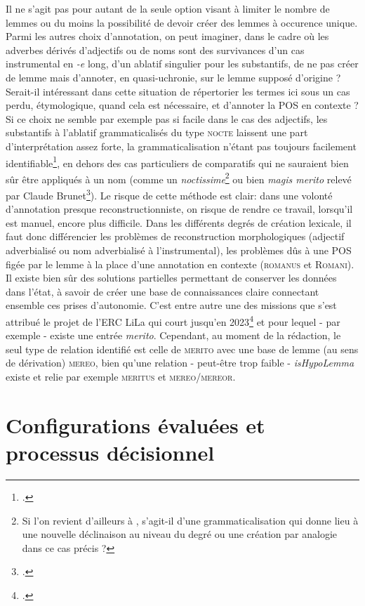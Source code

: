 Il ne s'agit pas pour autant de la seule option visant à limiter le nombre de lemmes ou du moins la possibilité de devoir créer des lemmes à occurence unique. Parmi les autres choix d'annotation, on peut imaginer, dans le cadre où les adverbes dérivés d'adjectifs ou de noms sont des survivances d'un cas instrumental en \textit{-e} long, d'un ablatif singulier pour les substantifs, de ne pas créer de lemme mais d'annoter, en quasi-uchronie, sur le lemme supposé d'origine ? Serait-il intéressant dans cette situation de répertorier les termes ici sous un cas perdu, étymologique, quand cela est nécessaire, et d'annoter la POS en contexte ? Si ce choix ne semble par exemple pas si facile dans le cas des adjectifs, les substantifs à l'ablatif grammaticalisés du type \textsc{nocte} laissent une part d'interprétation assez forte, la grammaticalisation n'étant pas toujours facilement identifiable\footcite{fruyt_adverbes_2008}, en dehors des cas particuliers de comparatifs qui ne sauraient bien sûr être appliqués à un nom (comme un \textit{noctissime}\footnote{Si l'on revient d'ailleurs à \cite{meillet_levolution_1922}, s'agit-il d'une grammaticalisation qui donne lieu à une nouvelle déclinaison au niveau du degré ou une création par analogie dans ce cas précis ?} ou bien \textit{magis merito} relevé par Claude Brunet\footcite{brunet_merito_2008}). Le risque de cette méthode est clair: dans une volonté d'annotation presque reconstructionniste, on risque de rendre ce travail, lorsqu'il est manuel, encore plus difficile. Dans les différents degrés de création lexicale, il faut donc différencier les problèmes de reconstruction morphologiques (adjectif adverbialisé ou nom adverbialisé à l'instrumental), les problèmes dûs à une POS figée par le lemme à la place d'une annotation en contexte (\textsc{romanus} et \textsc{Romani}). Il existe bien sûr des solutions partielles permettant de conserver les données dans l'état, à savoir de créer une base de connaissances claire connectant ensemble ces prises d'autonomie. C'est entre autre une des missions que s'est attribué le projet de l'ERC LiLa qui court jusqu'en 2023\footcite{passarotti_interlinking_2020} et pour lequel - par exemple - existe une entrée \textit{merito}. Cependant, au moment de la rédaction, le seul type de relation identifié est celle de \textsc{merito} avec une base de lemme (au sens de dérivation) \textsc{mereo}, bien qu'une relation - peut-être trop faible - \textit{isHypoLemma} existe et relie par exemple \textsc{meritus} et \textsc{mereo/mereor}.

\section{Configurations évaluées et processus décisionnel}

